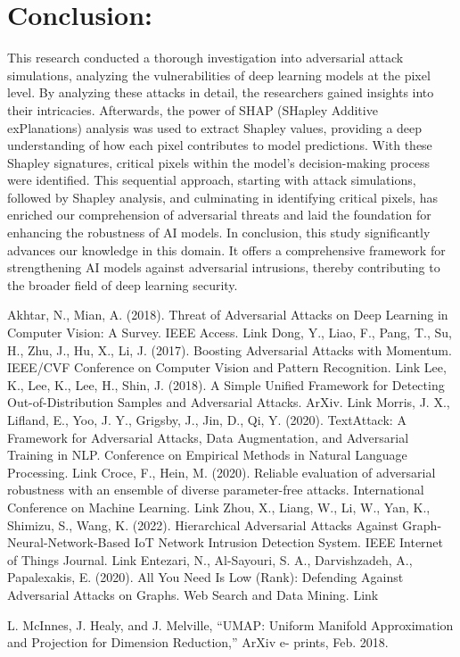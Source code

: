 \documentclass[10pt, conference, a4paper, final]{IEEEtran}
\begin{document}

\section{Conclusion:}
This research conducted a thorough investigation into adversarial attack simulations, analyzing the vulnerabilities of deep learning models at the pixel level. By analyzing these attacks in detail, the researchers gained insights into their intricacies. Afterwards, the power of SHAP (SHapley Additive exPlanations) analysis was used to extract Shapley values, providing a deep understanding of how each pixel contributes to model predictions. With these Shapley signatures, critical pixels within the model's decision-making process were identified. This sequential approach, starting with attack simulations, followed by Shapley analysis, and culminating in identifying critical pixels, has enriched our comprehension of adversarial threats and laid the foundation for enhancing the robustness of AI models. In conclusion, this study significantly advances our knowledge in this domain. It offers a comprehensive framework for strengthening AI models against adversarial intrusions, thereby contributing to the broader field of deep learning security.


\begin{thebibliography}{01}
    Akhtar, N., Mian, A. (2018). Threat of Adversarial Attacks on Deep Learning in Computer Vision: A Survey. IEEE Access. Link
    Dong, Y., Liao, F., Pang, T., Su, H., Zhu, J., Hu, X.,  Li, J. (2017). Boosting Adversarial Attacks with Momentum. IEEE/CVF Conference on Computer Vision and Pattern Recognition. Link
    Lee, K., Lee, K., Lee, H.,  Shin, J. (2018). A Simple Unified Framework for Detecting Out-of-Distribution Samples and Adversarial Attacks. ArXiv. Link
    Morris, J. X., Lifland, E., Yoo, J. Y., Grigsby, J., Jin, D.,  Qi, Y. (2020). TextAttack: A Framework for Adversarial Attacks, Data Augmentation, and Adversarial Training in NLP. Conference on Empirical Methods in Natural Language Processing. Link
    Croce, F., Hein, M. (2020). Reliable evaluation of adversarial robustness with an ensemble of diverse parameter-free attacks. International Conference on Machine Learning. Link
    Zhou, X., Liang, W., Li, W., Yan, K., Shimizu, S.,  Wang, K. (2022). Hierarchical Adversarial Attacks Against Graph-Neural-Network-Based IoT Network Intrusion Detection System. IEEE Internet of Things Journal. Link
    Entezari, N., Al-Sayouri, S. A., Darvishzadeh, A.,  Papalexakis, E. (2020). All You Need Is Low (Rank): Defending Against Adversarial Attacks on Graphs. Web Search and Data Mining. Link

	L. McInnes, J. Healy, and J. Melville, “UMAP: Uniform Manifold Approximation and Projection for Dimension Reduction,” ArXiv e- prints, Feb. 2018.
   

\end{thebibliography}
\end{document}
